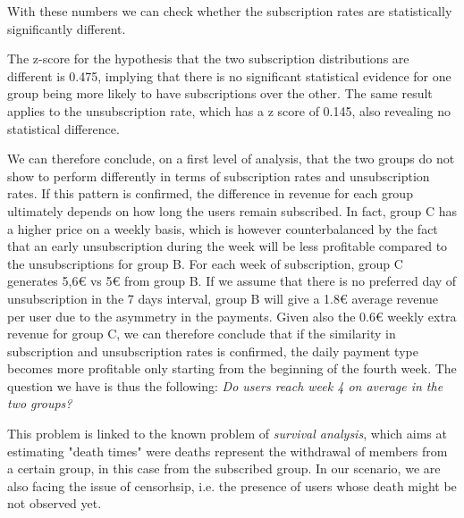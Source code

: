 \documentclass[paper=a4, fontsize=11pt]{report}
\begin{document}
With these numbers we can check whether the subscription rates are statistically significantly different.

The z-score for the hypothesis that the two subscription distributions are different is 0.475, implying that there is no significant statistical evidence for one group being more likely to have
subscriptions over the other. The same result applies to the unsubscription rate, which has a z score of 0.145, also revealing no statistical difference.

We can therefore conclude, on a first level of analysis, that the two groups do not show to perform differently in terms of subscription rates and unsubscription rates. If this 
pattern is confirmed, the difference in revenue for each group ultimately depends on how long the users remain subscribed. In fact, group C has a higher price on a weekly basis, which is
however counterbalanced by the fact that an early unsubscription during the week will be less profitable compared to the unsubscriptions for group B. For each week
of subscription, group C generates 5,6€ vs 5€ from group B. If we assume that there is no preferred day of unsubscription in the 7 days interval, group B will give a 1.8€ average
revenue per user due to the asymmetry in the payments. Given also the 0.6€ weekly extra revenue for group C, we can therefore conclude that if the similarity in subscription and
unsubscription rates is confirmed, the daily payment type becomes more profitable only starting from the beginning of the fourth week. The question we have is thus the following: \textit{Do users reach week 4 on average in the two groups?}


This problem is linked to the known problem of \textit{survival analysis}, which aims at estimating "death times" were deaths represent the withdrawal of members from a certain group,
in this case from the subscribed group. In our scenario, we are also facing the issue of censorhsip, i.e. the presence of users whose death might be not observed yet.
\end{document}
